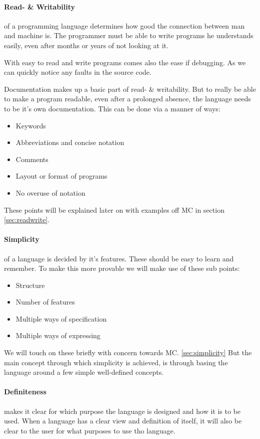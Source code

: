 \begin{multicols}{2}
   \paragraph{Read- \& Writability }
   of a programming language determines how good the connection between man and machine is.
   The programmer must be able to write programs he understands easily, even after months or years of not looking at it.

   With easy to read and write programs comes also the ease if debugging.
   As we can quickly notice any faults in the source code.

   Documentation makes up a basic part of read- \& writability.
   But to really be able to make a program readable, even after a prolonged absence, the language needs to be it's own documentation.
   This can be done via a manner of ways:
   \begin{itemize}
      \item Keywords
      \item Abbreviations and concise notation
      \item Comments
      \item Layout or format of programs
      \item No overuse of notation
   \end{itemize}
   These points will be explained later on with examples off MC in section \ref{sec:readwrite}.

   \paragraph{Simplicity}
   of a language is decided by it's features.
   These should be easy to learn and remember.
   To make this more provable we will make use of these sub points:
   \begin{itemize}
      \item Structure
      \item Number of features
      \item Multiple ways of specification
      \item Multiple ways of expressing
   \end{itemize}
   We will touch on these briefly with concern towards MC.
   \ref{sec:simplicity} But the main concept through which simplicity is achieved, is through basing the language around a few simple well-defined concepts.
   \cite{khedker1997makes}

   \paragraph{Definiteness}
   makes it clear for which purpose the language is designed and how it is to be used.
   When a language has a clear view and definition of itself, it will also be clear to the user for what purposes to use tho language.


\end{multicols}
